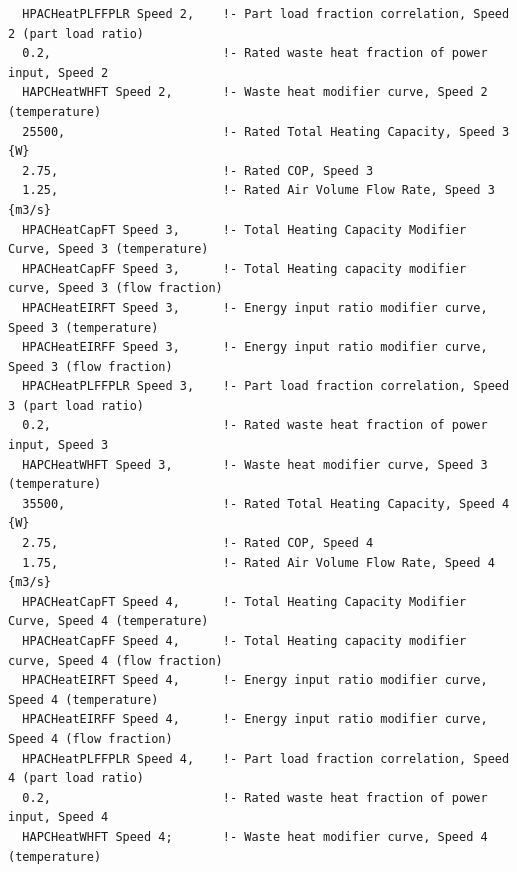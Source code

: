 \begin{lstlisting}
  HPACHeatPLFFPLR Speed 2,    !- Part load fraction correlation, Speed 2 (part load ratio)
  0.2,                        !- Rated waste heat fraction of power input, Speed 2
  HAPCHeatWHFT Speed 2,       !- Waste heat modifier curve, Speed 2 (temperature)
  25500,                      !- Rated Total Heating Capacity, Speed 3 {W}
  2.75,                       !- Rated COP, Speed 3
  1.25,                       !- Rated Air Volume Flow Rate, Speed 3 {m3/s}
  HPACHeatCapFT Speed 3,      !- Total Heating Capacity Modifier Curve, Speed 3 (temperature)
  HPACHeatCapFF Speed 3,      !- Total Heating capacity modifier curve, Speed 3 (flow fraction)
  HPACHeatEIRFT Speed 3,      !- Energy input ratio modifier curve, Speed 3 (temperature)
  HPACHeatEIRFF Speed 3,      !- Energy input ratio modifier curve, Speed 3 (flow fraction)
  HPACHeatPLFFPLR Speed 3,    !- Part load fraction correlation, Speed 3 (part load ratio)
  0.2,                        !- Rated waste heat fraction of power input, Speed 3
  HAPCHeatWHFT Speed 3,       !- Waste heat modifier curve, Speed 3 (temperature)
  35500,                      !- Rated Total Heating Capacity, Speed 4 {W}
  2.75,                       !- Rated COP, Speed 4
  1.75,                       !- Rated Air Volume Flow Rate, Speed 4 {m3/s}
  HPACHeatCapFT Speed 4,      !- Total Heating Capacity Modifier Curve, Speed 4 (temperature)
  HPACHeatCapFF Speed 4,      !- Total Heating capacity modifier curve, Speed 4 (flow fraction)
  HPACHeatEIRFT Speed 4,      !- Energy input ratio modifier curve, Speed 4 (temperature)
  HPACHeatEIRFF Speed 4,      !- Energy input ratio modifier curve, Speed 4 (flow fraction)
  HPACHeatPLFFPLR Speed 4,    !- Part load fraction correlation, Speed 4 (part load ratio)
  0.2,                        !- Rated waste heat fraction of power input, Speed 4
  HAPCHeatWHFT Speed 4;       !- Waste heat modifier curve, Speed 4 (temperature)


\end{lstlisting}
